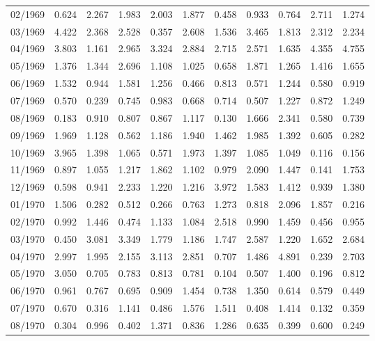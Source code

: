 \begin{tabular}{lrrrrrrrrrr}
02/1969 &  0.624 &  2.267 &  1.983 &  2.003 &  1.877 &  0.458 &  0.933 &  0.764 &  2.711 &  1.274 \\
03/1969 &  4.422 &  2.368 &  2.528 &  0.357 &  2.608 &  1.536 &  3.465 &  1.813 &  2.312 &  2.234 \\
04/1969 &  3.803 &  1.161 &  2.965 &  3.324 &  2.884 &  2.715 &  2.571 &  1.635 &  4.355 &  4.755 \\
05/1969 &  1.376 &  1.344 &  2.696 &  1.108 &  1.025 &  0.658 &  1.871 &  1.265 &  1.416 &  1.655 \\
06/1969 &  1.532 &  0.944 &  1.581 &  1.256 &  0.466 &  0.813 &  0.571 &  1.244 &  0.580 &  0.919 \\
07/1969 &  0.570 &  0.239 &  0.745 &  0.983 &  0.668 &  0.714 &  0.507 &  1.227 &  0.872 &  1.249 \\
08/1969 &  0.183 &  0.910 &  0.807 &  0.867 &  1.117 &  0.130 &  1.666 &  2.341 &  0.580 &  0.739 \\
09/1969 &  1.969 &  1.128 &  0.562 &  1.186 &  1.940 &  1.462 &  1.985 &  1.392 &  0.605 &  0.282 \\
10/1969 &  3.965 &  1.398 &  1.065 &  0.571 &  1.973 &  1.397 &  1.085 &  1.049 &  0.116 &  0.156 \\
11/1969 &  0.897 &  1.055 &  1.217 &  1.862 &  1.102 &  0.979 &  2.090 &  1.447 &  0.141 &  1.753 \\
12/1969 &  0.598 &  0.941 &  2.233 &  1.220 &  1.216 &  3.972 &  1.583 &  1.412 &  0.939 &  1.380 \\
01/1970 &  1.506 &  0.282 &  0.512 &  0.266 &  0.763 &  1.273 &  0.818 &  2.096 &  1.857 &  0.216 \\
02/1970 &  0.992 &  1.446 &  0.474 &  1.133 &  1.084 &  2.518 &  0.990 &  1.459 &  0.456 &  0.955 \\
03/1970 &  0.450 &  3.081 &  3.349 &  1.779 &  1.186 &  1.747 &  2.587 &  1.220 &  1.652 &  2.684 \\
04/1970 &  2.997 &  1.995 &  2.155 &  3.113 &  2.851 &  0.707 &  1.486 &  4.891 &  0.239 &  2.703 \\
05/1970 &  3.050 &  0.705 &  0.783 &  0.813 &  0.781 &  0.104 &  0.507 &  1.400 &  0.196 &  0.812 \\
06/1970 &  0.961 &  0.767 &  0.695 &  0.909 &  1.454 &  0.738 &  1.350 &  0.614 &  0.579 &  0.449 \\
07/1970 &  0.670 &  0.316 &  1.141 &  0.486 &  1.576 &  1.511 &  0.408 &  1.414 &  0.132 &  0.359 \\
08/1970 &  0.304 &  0.996 &  0.402 &  1.371 &  0.836 &  1.286 &  0.635 &  0.399 &  0.600 &  0.249 \\

\end{tabular}
